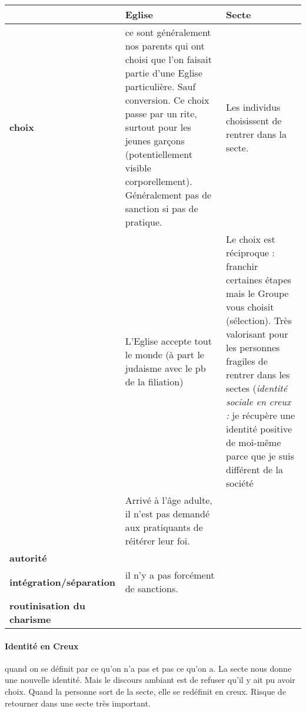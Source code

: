  \begin{table}[h!]
 \begin{small}
     

     

\begin{tabular}{p{2cm}p{4.5cm}p{4.5cm}}
\toprule
 & Eglise & Secte \\
 \midrule
\textbf{choix}  &   ce sont généralement nos parents qui ont choisi que l'on faisait partie d'une Eglise particulière. Sauf conversion. Ce choix passe par un rite, surtout pour les jeunes garçons (potentiellement visible corporellement). Généralement pas de sanction si pas de pratique.     &  Les individus choisissent de rentrer dans la secte.        \\
  &    L'Eglise accepte tout le monde (à part le judaisme avec le pb de la filiation)    &  Le choix est réciproque  :   franchir certaines étapes mais le Groupe vous choisit (sélection).      Très valorisant pour les personnes fragiles de rentrer dans les sectes (\textit{identité sociale en creux  :} je récupère une identité positive de moi-même parce que je suis différent de la société    \\
  &Arrivé à  l'âge adulte, il n'est pas demandé aux pratiquants de réitérer leur foi. & \\
\textbf{autorité} &        &       \\
\textbf{intégration/séparation} &   il n'y a pas forcément de sanctions.     &       \\
\textbf{routinisation du charisme} &        &      \\
\bottomrule
\end{tabular}
  \end{small}
\end{table}
 
 \FloatBarrier

\paragraph{Identité en Creux }
quand on se {définit par ce qu'on n'a pas et pas ce qu'on a}. La secte nous donne une nouvelle identité. Mais le discours ambiant est de refuser qu'il y ait pu avoir choix. Quand la personne sort de la secte, elle se redéfinit en creux. Risque de retourner dans une secte très important.

 

  

